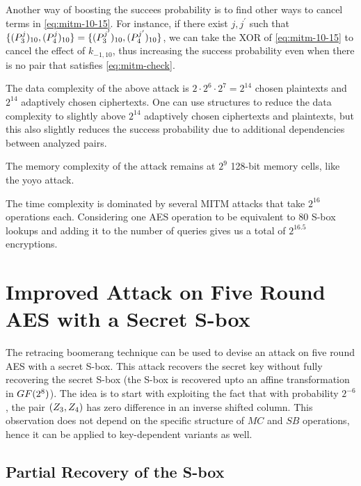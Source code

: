 \documentclass[twoside]{article}
\begin{document}
Another way of boosting the succees probability is to find other ways to cancel
terms in \eqref{eq:mitm-10-15}. For instance, if there exist \(j, j^\prime\)
such that \(\{(P_3^j)_{10}, (P_4^j)_{10}\} =
\{(P_3^{j^\prime})_{10}, (P_4^{j^\prime})_{10}\}\), we can take
the XOR of \eqref{eq:mitm-10-15} to cancel the effect of \(k_{-1, 10}\), thus
increasing the success probability even when there is no pair that satisfies
\eqref{eq:mitm-check}.

The data complexity of the above attack is \(2 \cdot 2^6 \cdot 2^7 = 2^{14}\)
chosen plaintexts and \(2^{14}\) adaptively chosen ciphertexts. One can use
structures to reduce the data complexity to slightly above \(2^{14}\) adaptively
chosen ciphertexts and plaintexts, but this also slightly reduces the success
probability due to additional dependencies between analyzed pairs. 

The memory complexity of the attack remains at \(2^9\) 128-bit memory cells,
like the yoyo attack.

The time complexity is dominated by several MITM attacks that take \(2^{16}\)
operations each. Considering one AES operation to be equivalent to 80 S-box
lookups and adding it to the number of queries gives us a total of \(2^{16.5}\)
encryptions.

\section{Improved Attack on Five Round AES with a Secret S-box}

The retracing boomerang technique can be used to devise an attack on five round
AES with a secret S-box. This attack recovers the secret key without fully
recovering the secret S-box (the S-box is recovered upto an affine
transformation in \(GF(2^8)\)). The idea is to start with exploiting the
fact that with probability \(2^{-6}\), the pair \((Z_3, Z_4)\) has zero
difference in an inverse shifted column. This observation does not depend on the
specific structure of \(MC\) and \(SB\) operations, hence it can be applied to
key-dependent variants as well.

\subsection{Partial Recovery of the S-box}
\end{document}
